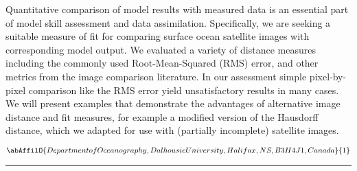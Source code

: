 \noindent Quantitative comparison of model results with measured data is an essential part of model skill assessment and data assimilation. Specifically, we are seeking a suitable measure of fit for comparing surface ocean satellite images with corresponding model output. We evaluated a variety of distance measures including the commonly used Root-Mean-Squared (RMS) error, and other metrics from the image comparison literature. In our assessment simple pixel-by-pixel comparison like the RMS error yield unsatisfactory results in many cases. We will present examples that demonstrate the advantages of alternative image distance and fit measures, for example a modified version of the Hausdorff distance, which we adapted for use with (partially incomplete) satellite images.

\begin{center}
   \vspace{2 mm} \begin{center}
    \vspace{2 mm}\begin{center}
  
  $\abAffilO{Department of Oceanography, Dalhousie University, Halifax, NS, B3H 4J1, Canada}{1}$

  \end{center}
  \vspace{2 mm}
  \end{center}\end{center}
  \begin{center}\rule{0.70\linewidth}{0.5 pt}\end{center}

